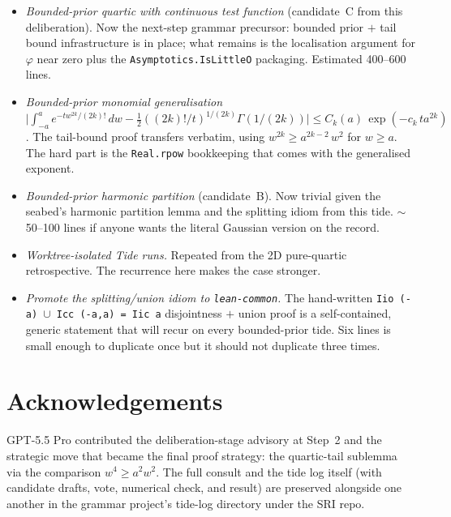 \documentclass[11pt]{article}
\begin{document}
\begin{itemize}
\item \emph{Bounded-prior quartic with continuous test function}
(candidate~C from this deliberation). Now the next-step grammar
precursor: bounded prior $+$ tail bound infrastructure is in place; what
remains is the localisation argument for $\varphi$ near zero plus the
\texttt{Asymptotics.IsLittleO} packaging. Estimated 400--600 lines.

\item \emph{Bounded-prior monomial generalisation}
$\big| \int_{-a}^{a} e^{-t w^{2k}/(2k)!}\,dw - \tfrac{1}{2}((2k)!/t)^{1/(2k)}
\Gamma(1/(2k)) \big| \le C_k(a)\,\exp(-c_k\,t a^{2k})$. The tail-bound
proof transfers verbatim, using $w^{2k} \ge a^{2k-2}\,w^2$ for $w \ge a$.
The hard part is the \texttt{Real.rpow} bookkeeping that comes with the
generalised exponent.

\item \emph{Bounded-prior harmonic partition} (candidate~B). Now
trivial given the seabed's harmonic partition lemma and the splitting
idiom from this tide. $\sim$\,50--100 lines if anyone wants the literal
Gaussian version on the record.

\item \emph{Worktree-isolated Tide runs.} Repeated from the 2D
pure-quartic retrospective. The recurrence here makes the case
stronger.

\item \emph{Promote the splitting/union idiom to \texttt{lean-common}.}
The hand-written \texttt{Iio\,(-a) \(\cup\) Icc\,(-a,a) = Iic\,a}
disjointness $+$ union proof is a self-contained, generic statement that
will recur on every bounded-prior tide. Six lines is small enough to
duplicate once but it should not duplicate three times.
\end{itemize}

\section*{Acknowledgements}

GPT-5.5 Pro contributed the deliberation-stage advisory at Step~2 and
the strategic move that became the final proof strategy: the
quartic-tail sublemma via the comparison $w^4 \ge a^2 w^2$. The full
consult and the tide log itself (with candidate drafts, vote, numerical
check, and result) are preserved alongside one another in the grammar
project's tide-log directory under the SRI repo.
\end{document}
